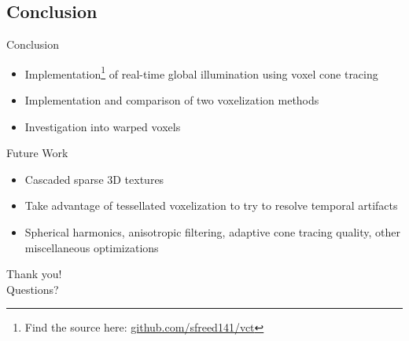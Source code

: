 \documentclass[10pt]{beamer}
\begin{document}

\subsection{Conclusion}
\begin{frame}{Conclusion}
  \begin{itemize}
    \item Implementation\footnote{Find the source here: \url{github.com/sfreed141/vct}} of real-time global illumination using voxel cone tracing
    \item Implementation and comparison of two voxelization methods
    \item Investigation into warped voxels
  \end{itemize}
\end{frame}

\begin{frame}{Future Work}


  \begin{itemize}
    \item Cascaded sparse 3D textures %
    \item Take advantage of tessellated voxelization to try to resolve temporal artifacts %
    \item Spherical harmonics, anisotropic filtering, adaptive cone tracing quality, other miscellaneous optimizations %
  \end{itemize}
\end{frame}

\begin{frame}[standout]
  \LARGE Thank you!\\
  \vspace{1cm}
  \LARGE Questions?
\end{frame}

\end{document}
